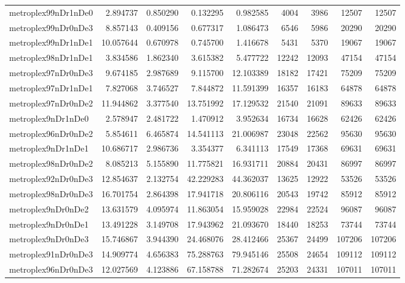 \begin{longtable}{|l|r|r|r|r|r|r|r|r|}
metroplex99nDr1nDe0 & 2.894737 & 0.850290 & 0.132295 & 0.982585 & 4004 & 3986 & 12507 & 12507 \\
metroplex99nDr0nDe3 & 8.857143 & 0.409156 & 0.677317 & 1.086473 & 6546 & 5986 & 20290 & 20290 \\
metroplex99nDr1nDe1 & 10.057644 & 0.670978 & 0.745700 & 1.416678 & 5431 & 5370 & 19067 & 19067 \\
metroplex98nDr1nDe1 & 3.834586 & 1.862340 & 3.615382 & 5.477722 & 12242 & 12093 & 47154 & 47154 \\
metroplex97nDr0nDe3 & 9.674185 & 2.987689 & 9.115700 & 12.103389 & 18182 & 17421 & 75209 & 75209 \\
metroplex97nDr1nDe1 & 7.827068 & 3.746527 & 7.844872 & 11.591399 & 16357 & 16183 & 64878 & 64878 \\
metroplex97nDr0nDe2 & 11.944862 & 3.377540 & 13.751992 & 17.129532 & 21540 & 21091 & 89633 & 89633 \\
metroplex9nDr1nDe0 & 2.578947 & 2.481722 & 1.470912 & 3.952634 & 16734 & 16628 & 62426 & 62426 \\
metroplex96nDr0nDe2 & 5.854611 & 6.465874 & 14.541113 & 21.006987 & 23048 & 22562 & 95630 & 95630 \\
metroplex9nDr1nDe1 & 10.686717 & 2.986736 & 3.354377 & 6.341113 & 17549 & 17368 & 69631 & 69631 \\
metroplex98nDr0nDe2 & 8.085213 & 5.155890 & 11.775821 & 16.931711 & 20884 & 20431 & 86997 & 86997 \\
metroplex92nDr0nDe3 & 12.854637 & 2.132754 & 42.229283 & 44.362037 & 13625 & 12922 & 53526 & 53526 \\
metroplex98nDr0nDe3 & 16.701754 & 2.864398 & 17.941718 & 20.806116 & 20543 & 19742 & 85912 & 85912 \\
metroplex9nDr0nDe2 & 13.631579 & 4.095974 & 11.863054 & 15.959028 & 22984 & 22524 & 96087 & 96087 \\
metroplex9nDr0nDe1 & 13.491228 & 3.149708 & 17.943962 & 21.093670 & 18440 & 18253 & 73744 & 73744 \\
metroplex9nDr0nDe3 & 15.746867 & 3.944390 & 24.468076 & 28.412466 & 25367 & 24499 & 107206 & 107206 \\
metroplex91nDr0nDe3 & 14.909774 & 4.656383 & 75.288763 & 79.945146 & 25508 & 24654 & 109112 & 109112 \\
metroplex96nDr0nDe3 & 12.027569 & 4.123886 & 67.158788 & 71.282674 & 25203 & 24331 & 107011 & 107011 \\
\end{longtable}
